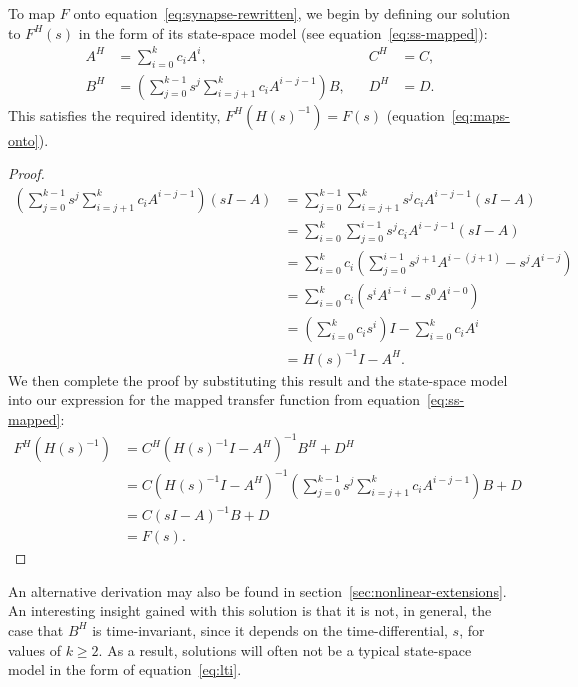\begin{theorem}
\label{thm:general-linear}
To map $F$ onto equation~\ref{eq:synapse-rewritten}, we begin by defining our solution to $F^{H}(s)$ in the form of its state-space model (see equation~\ref{eq:ss-mapped}):
\begin{equation} \label{eq:general-linear}
\begin{aligned}
A^H &= \sum_{i=0}^k c_i A^i \text{,} & \quad C^H &= C \text{,} \\
B^H &= \left( \sum_{j=0}^{k-1} s^j \sum_{i=j+1}^k c_i A^{i-j-1} \right) B \text{,} & \quad D^H &= D \text{.}
\end{aligned}
\end{equation}
This satisfies the required identity, $F^{H}(H(s)^{-1}) = F(s)$ (equation~\ref{eq:maps-onto}).
\end{theorem}

\begin{proof}
\begin{align*}
\left( \sum_{j=0}^{k-1} s^j \sum_{i=j+1}^k c_i A^{i-j-1} \right) (sI - A)  &= \sum_{j=0}^{k-1} \sum_{i=j+1}^k s^j c_i A^{i-j-1} (sI - A) \\
&= \sum_{i=0}^{k} \sum_{j=0}^{i-1} s^j c_i A^{i-j-1} (sI - A)  \\
&= \sum_{i=0}^k c_i \left( \sum_{j=0}^{i-1} s^{j+1} A^{i - (j + 1)} - s^j A^{i - j} \right) \\
&= \sum_{i=0}^k c_i \left( s^i A^{i - i} - s^0 A^{i-0} \right) \\
&= \left( \sum_{i=0}^k c_i s^i \right) I - \sum_{i=0}^k c_i A^i \\
&= H(s)^{-1}I - A^H \text{.}
\end{align*}
We then complete the proof by substituting this result and the state-space model into our expression for the mapped transfer function from equation~\ref{eq:ss-mapped}:
\begin{align*}
F^H(H(s)^{-1}) &= C^H(H(s)^{-1}I - A^H)^{-1} B^H + D^H \\
&= C(H(s)^{-1}I - A^H)^{-1} \left( \sum_{j=0}^{k-1} s^j \sum_{i=j+1}^k c_i A^{i-j-1} \right) B + D \\
&= C(sI - A)^{-1} B + D \\
&= F(s) \text{.}
\end{align*}
\end{proof}

An alternative derivation may also be found in section~\ref{sec:nonlinear-extensions}. %
An interesting insight gained with this solution is that it is not, in general, the case that $B^H$ is time-invariant, since it depends on the time-differential, $s$, for values of $k \ge 2$.
As a result, solutions will often not be a typical state-space model in the form of equation~\ref{eq:lti}.

